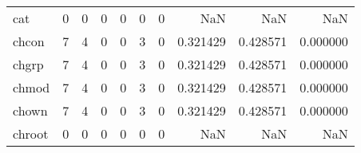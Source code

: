 \begin{longtable}{lrrrrrrrrr}
cat       &                                                  0 &                                                  0 &                                                  0 &                                                  0 &                                                  0 &                                                  0 &                                                NaN &                                    NaN &                                  NaN \\
chcon     &                                                  7 &                                                  4 &                                                  0 &                                                  0 &                                                  3 &                                                  0 &                                           0.321429 &                               0.428571 &                             0.000000 \\
chgrp     &                                                  7 &                                                  4 &                                                  0 &                                                  0 &                                                  3 &                                                  0 &                                           0.321429 &                               0.428571 &                             0.000000 \\
chmod     &                                                  7 &                                                  4 &                                                  0 &                                                  0 &                                                  3 &                                                  0 &                                           0.321429 &                               0.428571 &                             0.000000 \\
chown     &                                                  7 &                                                  4 &                                                  0 &                                                  0 &                                                  3 &                                                  0 &                                           0.321429 &                               0.428571 &                             0.000000 \\
chroot    &                                                  0 &                                                  0 &                                                  0 &                                                  0 &                                                  0 &                                                  0 &                                                NaN &                                    NaN &                                  NaN \\

\end{longtable}
